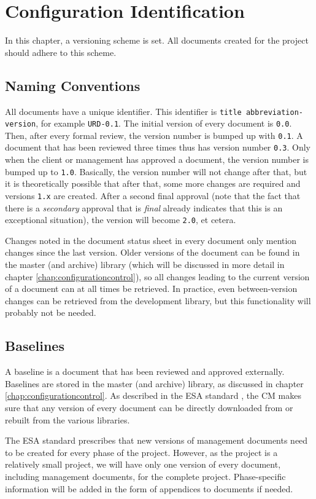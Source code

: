 \chapter{Configuration Identification}
\label{chap:configurationidentification}
In this chapter, a versioning scheme is set. All documents created for the \projectname{} project should adhere to this scheme.

\section{Naming Conventions}
All documents have a unique identifier. This identifier is \texttt{title abbreviation-version}, for example \texttt{URD-0.1}. The initial version of every document is \texttt{0.0}. Then, after every formal review, the version number is bumped up with \texttt{0.1}. A document that has been reviewed three times thus has version number \texttt{0.3}. Only when the client or management has approved a document, the version number is bumped up to \texttt{1.0}. Basically, the version number will not change after that, but it is theoretically possible that after that, some more changes are required and versions \texttt{1.x} are created. After a second final approval (note that the fact that there is a \emph{secondary} approval that is \emph{final} already indicates that this is an exceptional situation), the version will become \texttt{2.0}, et cetera.

Changes noted in the document status sheet in every document only mention changes since the last version. Older versions of the document can be found in the master (and archive) library (which will be discussed in more detail in chapter \ref{chap:configurationcontrol}), so all changes leading to the current version of a document can at all times be retrieved. In practice, even between-version changes can be retrieved from the development library, but this functionality will probably not be needed.

\section{Baselines}
A baseline is a document that has been reviewed and approved externally. Baselines are stored in the master (and archive) library, as discussed in chapter \ref{chap:configurationcontrol}. As described in the ESA standard \cite{esa}, the CM makes sure that any version of every document can be directly downloaded from or rebuilt from the various libraries.

The ESA standard prescribes that new versions of management documents need to be created for every phase of the project. However, as the \projectname{} project is a relatively small project, we will have only one version of every document, including management documents, for the complete project. Phase-specific information will be added in the form of appendices to documents if needed.